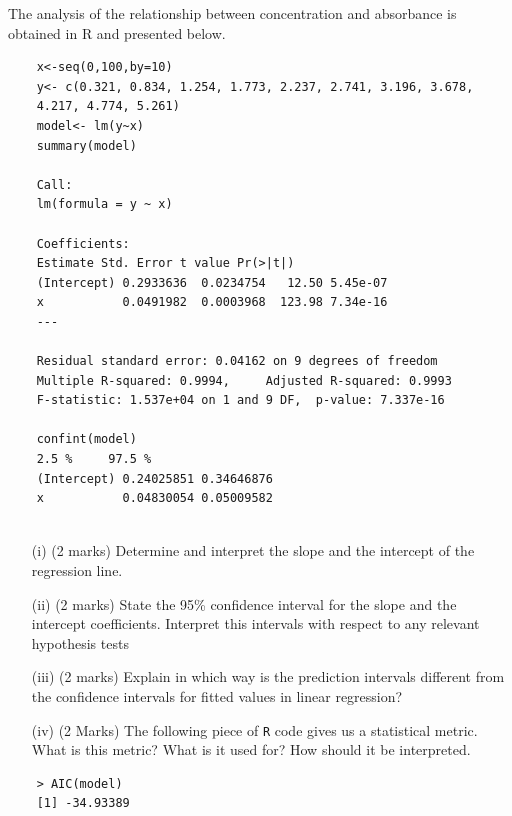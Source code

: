 \documentclass[a4paper,12pt]{article}
\begin{document}
The analysis of the relationship between concentration and absorbance is obtained in R and presented below. 
\begin{framed}
	\begin{verbatim}
	x<-seq(0,100,by=10)
	y<- c(0.321, 0.834, 1.254, 1.773, 2.237, 2.741, 3.196, 3.678, 
	4.217, 4.774, 5.261)
	model<- lm(y~x)
	summary(model)
	
	Call:
	lm(formula = y ~ x)
	
	Coefficients:
	Estimate Std. Error t value Pr(>|t|)    
	(Intercept) 0.2933636  0.0234754   12.50 5.45e-07 
	x           0.0491982  0.0003968  123.98 7.34e-16 
	---
	
	Residual standard error: 0.04162 on 9 degrees of freedom
	Multiple R-squared: 0.9994,     Adjusted R-squared: 0.9993 
	F-statistic: 1.537e+04 on 1 and 9 DF,  p-value: 7.337e-16 
	
	confint(model)
	2.5 %     97.5 %
	(Intercept) 0.24025851 0.34646876
	x           0.04830054 0.05009582
	
	\end{verbatim}
\end{framed}
\newpage
\begin{itemize}
	\item[(i)] (2 marks)
	Determine and interpret the slope and the intercept of the regression line.
	\item[(ii)]  (2 marks) State the 95\% confidence interval for the slope and the intercept coefficients. Interpret this intervals with respect to any relevant hypothesis tests
	\item[(iii)] (2 marks) Explain in which way is the prediction intervals different from the confidence intervals for fitted values in linear regression?
	\item[(iv)] (2 Marks) The following piece of \texttt{R} code gives us a statistical metric. What is this metric? What is it used for? How should it be interpreted.
	
\end{itemize}
\begin{framed}
	\begin{verbatim}
	> AIC(model)
	[1] -34.93389	
	\end{verbatim}
\end{framed}


\end{document}
